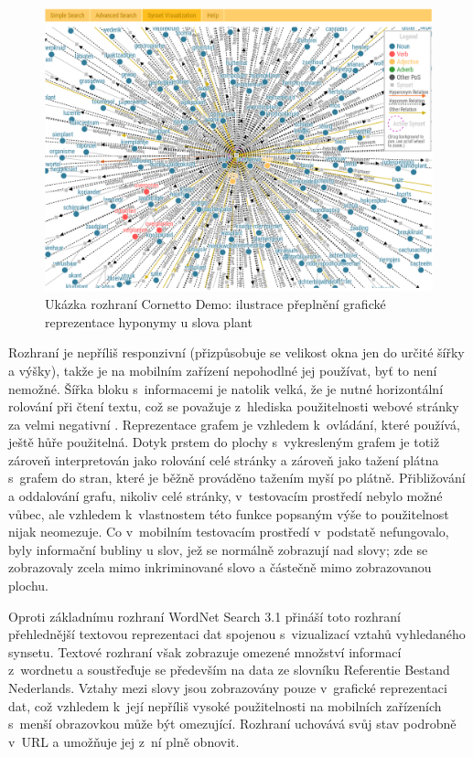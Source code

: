 \documentclass[a4paper, 11pt, oneside, showtrims]{book}
\newcommand\ex{\textsf}
\begin{document}
					\begin{figure}[h]
						\centering
						\includegraphics[width=1.0\textwidth]{wncorplant.png}
						\caption{Ukázka rozhraní Cornetto Demo: ilustrace přeplnění grafické reprezentace hyponymy u slova \ex{plant}}
						\label{fig:wncorplant}
					\end{figure}

					Rozhraní je nepříliš responzivní (přizpůsobuje se velikost okna jen do určité šířky a výšky), takže je na mobilním zařízení nepohodlné jej používat, byť to není nemožné. Šířka bloku s~informacemi je natolik velká, že je nutné horizontální rolování při čtení textu, což se považuje z~hlediska použitelnosti webové stránky za velmi negativní \parencite{nn2005scrollbar, richards2004web}. Reprezentace grafem je vzhledem k~ovládání, které používá, ještě hůře použitelná. Dotyk prstem do plochy s~vykresleným grafem je totiž zároveň interpretován jako rolování celé stránky a zároveň jako tažení plátna s~grafem do stran, které je běžně prováděno tažením myší po plátně. Přibližování a oddalování grafu, nikoliv celé stránky, v~testovacím prostředí nebylo možné vůbec, ale vzhledem k~vlastnostem této funkce popsaným výše to použitelnost nijak neomezuje. Co v~mobilním testovacím prostředí v~podstatě nefungovalo, byly informační bubliny u slov, jež se normálně zobrazují nad slovy; zde se zobrazovaly zcela mimo inkriminované slovo a částečně mimo zobrazovanou plochu.

					Oproti základnímu rozhraní WordNet Search 3.1 přináší toto rozhraní přehlednější textovou reprezentaci dat spojenou s~vizualizací vztahů vyhledaného synsetu. Textové rozhraní však zobrazuje omezené množství informací z~wordnetu a soustřeďuje se především na data ze slovníku Referentie Bestand Nederlands. Vztahy mezi slovy jsou zobrazovány pouze v~grafické reprezentaci dat, což vzhledem k~její nepříliš vysoké použitelnosti na mobilních zařízeních s~menší obrazovkou může být omezující. Rozhraní uchovává svůj stav podrobně v~URL a umožňuje jej z~ní plně obnovit.
\end{document}
